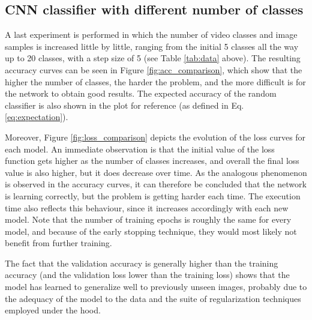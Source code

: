 \documentclass[letterpaper, 10 pt, conference]{IEEEtran}
\begin{document}
\subsection{CNN classifier with different number of classes}

A last experiment is performed in which the number of video classes and image samples is increased little by little, ranging from the initial 5 classes all the way up to 20 classes, with a step size of 5 (see Table \ref{tab:data} above). The resulting accuracy curves can be seen in Figure \ref{fig:acc_comparison}, which show that the higher the number of classes, the harder the problem, and the more difficult is for the network to obtain good results. The expected accuracy of the random classifier is also shown in the plot for reference (as defined in Eq. \ref{eq:expectation}).

Moreover, Figure \ref{fig:loss_comparison} depicts the evolution of the loss curves for each model. An immediate observation is that the initial value of the loss function gets higher as the number of classes increases, and overall the final loss value is also higher, but it does decrease over time. As the analogous phenomenon is observed in the accuracy curves, it can therefore be concluded that the network is learning correctly, but the problem is getting harder each time. The execution time also reflects this behaviour, since it increases accordingly with each new model. Note that the number of training epochs is roughly the same for every model, and because of the early stopping technique, they would most likely not benefit from further training.

The fact that the validation accuracy is generally higher than the training accuracy (and the validation loss lower than the training loss) shows that the model has learned to generalize well to previously unseen images, probably due to the adequacy of the model to the data and the suite of regularization techniques employed under the hood.
\end{document}
